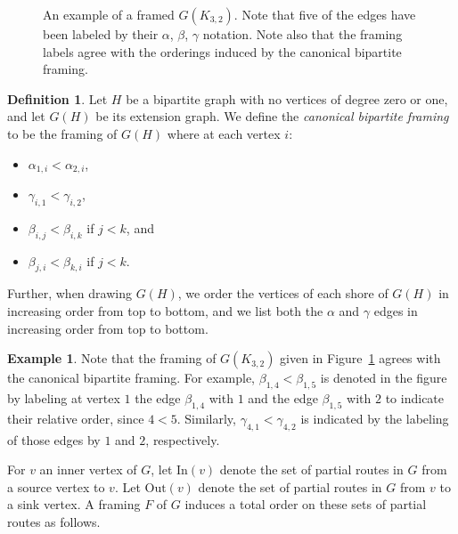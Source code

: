 \documentclass[12pt]{amsart}
\theoremstyle{definition}
\newtheorem{definition}[theorem]{Definition}
\newtheorem{example}[theorem]{Example}
\newcommand\In{\mathrm{In}}
\newcommand\Out{\mathrm{Out}}
\begin{document}
\begin{figure}
\begin{center}
\end{center}
    \caption{An example of a framed $G(K_{3,2})$. Note that five of the edges have been labeled by their $\alpha$, $\beta$, $\gamma$ notation. Note also that the framing labels agree with the orderings induced by the canonical bipartite framing.}
\label{fig:framedcompletebipartiteextension}
\end{figure}



\begin{definition}
    Let $H$ be a bipartite graph with no vertices of degree zero or one, and let $G(H)$ be its extension graph.
    We define the \emph{canonical bipartite framing} to be the framing of $G(H)$ where at each vertex $i$:
    \begin{itemize}
        \item 
    $\alpha_{1,i}<\alpha_{2,i}$,
    \item $\gamma_{i,1}<\gamma_{i,2}$,
    \item $\beta_{i,j}<\beta_{i,k}$ if $j<k$, and
    \item $\beta_{j,i}<\beta_{k,i}$ if $j<k$.
    \end{itemize}
Further, when drawing $G(H)$, we order the vertices of each shore of $G(H)$ in increasing order from top to bottom, and we list both the $\alpha$ and $\gamma$ edges in increasing order from top to bottom.
\end{definition}

\begin{example}
    Note that the framing of $G(K_{3,2})$ given in Figure~\ref{fig:framedcompletebipartiteextension} agrees with the canonical bipartite framing.
    For example, $\beta_{1,4}<\beta_{1,5}$ is denoted in the figure by labeling at vertex $1$ the edge $\beta_{1,4}$ with $1$ and the edge $\beta_{1,5}$ with $2$ to indicate their relative order, since $4<5$.
    Similarly, $\gamma_{4,1}<\gamma_{4,2}$ is indicated by the labeling of those edges by $1$ and $2$, respectively.
\end{example}

For $v$ an inner vertex of $G$, let $\In(v)$ denote the set of partial routes in $G$ from a source vertex to $v$.
Let $\Out(v)$ denote the set of partial routes in $G$ from $v$ to a sink vertex.
A framing $F$ of $G$ induces a total order on these sets of partial routes as follows.
\end{document}
